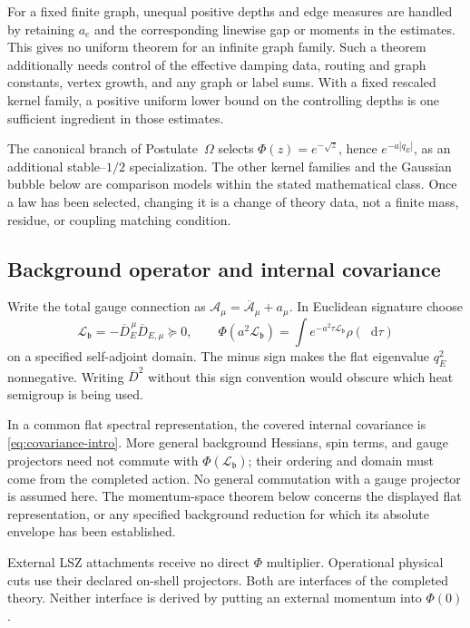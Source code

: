 \documentclass[final,5p,times,twocolumn,numbers,nopreprintline]{elsarticle}
\numberwithin{equation}{section}
\theoremstyle{definition}
\theoremstyle{remark}
\newcommand{\dd}{\mathop{}\!\mathrm d}
\newcommand{\bb}{\mathfrak b}
\newcommand{\Ph}{\Phi}
\begin{document}
For a fixed finite graph, unequal positive depths and edge measures
are handled by retaining \(a_e\) and the corresponding linewise
gap or moments in the estimates. This gives no uniform theorem for
an infinite graph family. Such a theorem additionally needs control
of the effective damping data, routing and graph constants, vertex
growth, and any graph or label sums. With a fixed rescaled kernel
family, a positive uniform lower bound on the controlling depths is
one sufficient ingredient in those estimates.

The canonical branch of Postulate~\(\Omega\) selects
\(\Ph(z)=e^{-\sqrt z}\), hence \(e^{-a|q_E|}\), as an
additional stable--\(1/2\) specialization. The other kernel families
and the Gaussian bubble below are comparison models within the stated
mathematical class. Once a law has been selected, changing it is a
change of theory data, not a finite mass, residue, or coupling matching
condition.

\subsection{Background operator and internal covariance}

Write the total gauge connection as
\(\mathcal A_\mu=\overline{\mathcal A}_\mu+a_\mu\).
In Euclidean signature choose
\begin{equation}
 \mathscr L_{\bb}=-\overline D_E^{\,\mu}\overline D_{E,\mu}
    \succeq0,\qquad
 \Ph(a^2\mathscr L_{\bb})
     =\int e^{-a^2\tau\mathscr L_{\bb}}\rho(\dd\tau)
 \label{eq:positive-operator}
\end{equation}
on a specified self-adjoint domain. The minus sign makes the flat
eigenvalue \(q_E^2\) nonnegative. Writing
\(\overline D^2\) without this sign convention would obscure which
heat semigroup is being used.

In a common flat spectral representation, the covered internal
covariance is \eqref{eq:covariance-intro}. More general background
Hessians, spin terms, and gauge projectors need not commute with
\(\Ph(\mathscr L_{\bb})\); their ordering and domain must come from
the completed action. No general commutation with a gauge projector
is assumed here. The momentum-space theorem below concerns the
displayed flat representation, or any specified background reduction
for which its absolute envelope has been established.

External LSZ attachments receive no direct \(\Ph\) multiplier.
Operational physical cuts use their declared on-shell projectors.
Both are interfaces of the completed theory. Neither interface is
derived by putting an external momentum into
\(\Ph(0)\).
\end{document}
